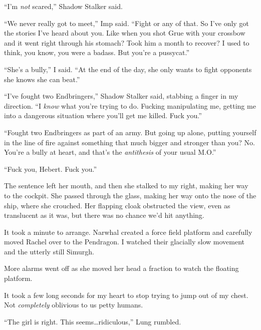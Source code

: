 ``I'm \emph{not} scared,'' Shadow Stalker said.



``We never really got to meet,'' Imp said.  ``Fight or any of that.  So I've only got the stories I've heard about you.  Like when you shot Grue with your crossbow and it went right through his stomach?  Took him a month to recover?  I used to think, you know, you were a badass.  But you're a pussycat.''



``She's a bully,'' I said.  ``At the end of the day, she only wants to fight opponents she knows she can beat.''



``I've fought two Endbringers,'' Shadow Stalker said, stabbing a finger in my direction.  ``I \emph{know }what you're trying to do.  Fucking manipulating me, getting me into a dangerous situation where you'll get me killed.  Fuck you.''



``Fought two Endbringers as part of an army.  But going up alone, putting yourself in the line of fire against something that much bigger and stronger than you?  No.  You're a bully at heart, and that's the \emph{antithesis} of your usual M.O.''



``Fuck you, Hebert.  Fuck you.''



The sentence left her mouth, and then she stalked to my right, making her way to the cockpit.  She passed through the glass, making her way onto the nose of the ship, where she crouched.  Her flapping cloak obstructed the view, even as translucent as it was, but there was no chance we'd hit anything.



It took a minute to arrange.  Narwhal created a force field platform and carefully moved Rachel over to the Pendragon.  I watched their glacially slow movement and the utterly still Simurgh.



More alarms went off as she moved her head a fraction to watch the floating platform.



It took a few long seconds for my heart to stop trying to jump out of my chest.  Not \emph{completely} oblivious to us petty humans.



``The girl is right.  This seems\ldots ridiculous,'' Lung rumbled.



